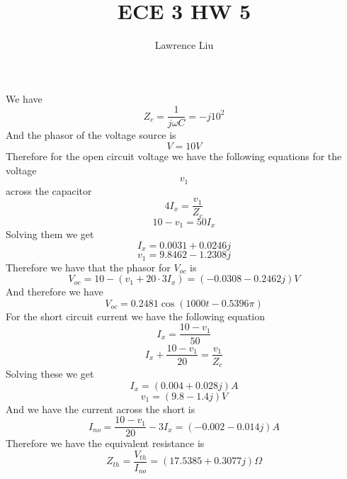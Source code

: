 \documentclass[12pt]{article}
\title{ECE 3 HW 5}
\author{Lawrence Liu}
\begin{document}
\maketitle
We have
$$Z_c=\frac{1}{j\omega C}=-j10^2$$
And the phasor of the voltage source is
$$V=10V$$
Therefore for the open circuit voltage we have the following equations for the voltage
$$v_1$$ across the capacitor
$$4I_x=\frac{v_1}{Z_c}$$
$$10-v_1=50I_x$$
Solving them we get
$$I_x=0.0031+0.0246j$$
$$v_1=9.8462-1.2308j$$
Therefore we have that the phasor for $V_{oc}$ is
$$V_{oc}=10-(v_1+20\cdot3I_x)=\boxed{(-0.0308-0.2462j) V}$$
And therefore we have
$$V_{oc}=\boxed{0.2481\cos(1000t-0.5396\pi)}$$
For the short circuit current we have the following equation
$$I_x=\frac{10-v_1}{50}$$
$$I_x+\frac{10-v_1}{20}=\frac{v_1}{Z_c}$$
Solving these we get
$$I_x=(0.004+0.028j)A$$
$$v_1=(9.8-1.4j)V$$
And we have the current across the short is
$$I_{no}=\frac{10-v_1}{20}-3I_x=(-0.002-0.014j)A$$
Therefore we have the equivalent resistance is
$$Z_{th}=\frac{V_{th}}{I_{no}}=\boxed{(17.5385+0.3077j)\Omega}$$
\end{document}
